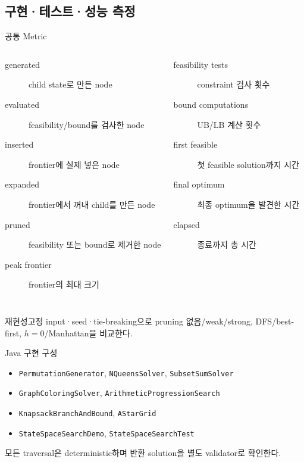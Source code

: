 \subsection{구현·테스트·성능 측정}
\begin{frame}{공통 Metric}
\footnotesize
\begin{columns}[T]
\begin{description}
\item[generated] child state로 만든 node
\item[evaluated] feasibility/bound를 검사한 node
\item[inserted] frontier에 실제 넣은 node
\item[expanded] frontier에서 꺼내 child를 만든 node
\item[pruned] feasibility 또는 bound로 제거한 node
\item[peak frontier] frontier의 최대 크기
\end{description}
\begin{description}
\item[feasibility tests] constraint 검사 횟수
\item[bound computations] UB/LB 계산 횟수
\item[first feasible] 첫 feasible solution까지 시간
\item[final optimum] 최종 optimum을 발견한 시간
\item[elapsed] 종료까지 총 시간
\end{description}
\end{columns}
\begin{block}{재현성}고정 input·seed·tie-breaking으로 pruning 없음/weak/strong, DFS/best-first, \(h=0\)/Manhattan을 비교한다.\end{block}
\end{frame}
\begin{frame}{Java 구현 구성 \hfill \ssoptional[참고 구현]}
\small
\begin{itemize}
\item \texttt{PermutationGenerator}, \texttt{NQueensSolver}, \texttt{SubsetSumSolver}
\item \texttt{GraphColoringSolver}, \texttt{ArithmeticProgressionSearch}
\item \texttt{KnapsackBranchAndBound}, \texttt{AStarGrid}
\item \texttt{StateSpaceSearchDemo}, \texttt{StateSpaceSearchTest}
\end{itemize}
모든 traversal은 deterministic하며 반환 solution을 별도 validator로 확인한다.
\end{frame}
